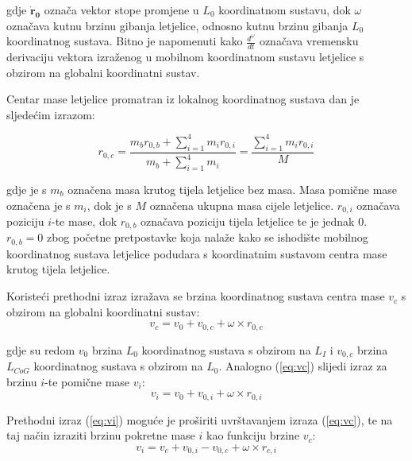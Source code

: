 \documentclass[11pt,a4paper]{article}
\begin{document}
gdje $\boldsymbol{\dot{r}_{0}}$ označa vektor stope promjene u $L_{0}$ koordinatnom sustavu, dok $\omega$  označava kutnu brzinu gibanja letjelice, odnosno kutnu brzinu gibanja $L_{0}$ koordinatnog sustava. Bitno je napomenuti kako $\frac{d^{\omega}}{dt}$ označava vremensku derivaciju vektora izraženog u mobilnom koordinatnom sustavu letjelice s obzirom na globalni koordinatni sustav. 

\medskip

Centar mase letjelice promatran iz lokalnog koordinatnog sustava dan je sljedećim izrazom:

\begin{equation}
 {r}_{0,c} = \frac{ {m}_{b} {r}_{0,b} + \sum_{i=1}^{4}{m}_{i} {r}_{0,i}}{{m}_{b} + \sum_{i=1}^{4} {m}_{i}} = \frac{\sum_{i=1}^{4} {m}_{i} {r}_{0,i}}{ {M}}
\label{eq:r0c}
\end{equation}

\medskip

gdje je s $m_{b}$ označena masa krutog tijela letjelice bez masa. Masa pomične mase označena je s $m_{i}$, dok je s $M$ označena ukupna masa cijele letjelice. $r_{0,i}$ označava poziciju $i$-te mase, dok $r_{0,b}$ označava poziciju tijela letjelice te je jednak 0. $r_{0,b} = 0$ zbog početne pretpostavke koja nalaže kako se ishodište mobilnog koordinatnog sustava letjelice podudara s koordinatnim sustavom centra mase krutog tijela letjelice. 

\medskip

Koristeći prethodni izraz izražava se brzina koordinatnog sustava centra mase $v_{c}$ s obzirom na globalni koordinatni sustav:
\begin{equation}
 {v_{c} = v_{0} + v_{0,c} + \omega \times r_{0,c}}
\label{eq:vc}
\end{equation}

gdje su redom $v_{0}$ brzina $L_{0}$ koordinatnog sustava s obzirom na $L_{I}$ i $v_{0,c}$ brzina $L_{CoG}$ koordinatnog sustava s obzirom na $L_{0}$. Analogno (\ref{eq:vc}) slijedi izraz za brzinu $i$-te pomične mase $v_{i}$:
\begin{equation}
 {v_{i} = v_{0} + v_{0,i} + \omega \times r_{0,i}}
\label{eq:vi}
\end{equation}

Prethodni izraz (\ref{eq:vi}) moguće je proširiti uvrštavanjem izraza (\ref{eq:vc}), te na taj način izraziti brzinu pokretne mase $i$ kao funkciju brzine $v_{c}$: 
\begin{equation}
 {v_{i} = v_{c} + v_{0,i} - v_{0,c} + \omega \times r_{c,i}}
\label{eq:vi2}
\end{equation}
\end{document}
